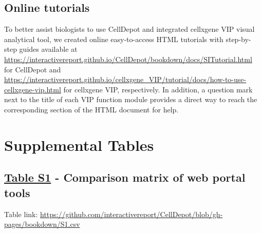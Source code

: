 \documentclass[runningheads]{llncs}
\begin{document}
\hypertarget{online-tutorials}{%
\section{Online tutorials}\label{online-tutorials}}

To better assist biologists to use CellDepot and integrated cellxgene VIP visual analytical tool, we created online easy-to-access HTML tutorials with step-by-step guides available at \url{https://interactivereport.github.io/CellDepot/bookdown/docs/SITutorial.html} for CellDepot and \url{https://interactivereport.github.io/cellxgene_VIP/tutorial/docs/how-to-use-cellxgene-vip.html} for cellxgene VIP, respectively. In addition, a question mark next to the title of each VIP function module provides a direct way to reach the corresponding section of the HTML document for help.

\hypertarget{SITable}{%
\chapter{Supplemental Tables}\label{SITable}}

\hypertarget{table-s1---comparison-matrix-of-web-portal-tools}{%
\section*{\texorpdfstring{\href{https://github.com/interactivereport/CellDepot/blob/gh-pages/bookdown/S1.csv}{Table S1} - Comparison matrix of web portal tools}{Table S1 - Comparison matrix of web portal tools}}\label{table-s1---comparison-matrix-of-web-portal-tools}}

Table link: \url{https://github.com/interactivereport/CellDepot/blob/gh-pages/bookdown/S1.csv}
\end{document}
